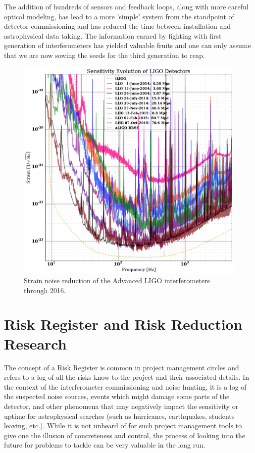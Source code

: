 The addition of hundreds of sensors and feedback loops, along with more careful
optical modeling, has lead to a more 'simple' system from the standpoint of
detector commissioning and has reduced the time between installation and astrophysical
data taking. The information earned by fighting with first generation of
interferometers has yielded valuable fruits and one can only assume that we are
now sowing the seeds for the third generation to reap.

\begin{figure}[h]
\centering
\includegraphics[width=\columnwidth]{Figures/aLIGO_noises.pdf}
\caption{Strain noise reduction of the Advanced LIGO interferometers
  through 2016.}
\label{fig:IDC:aLIGOnoises}
\end{figure}


\section{Risk Register and Risk Reduction Research}
\label{s:IDC:Risk}
The concept of a Risk Register is common in project management circles and refers
to a log of all the risks know to the project and their associated details. In
the context of the interferometer commissioning and noise hunting, it is a log of
the suspected noise sources, events which might damage some parts of the detector,
and other phenomena that may negatively impact the sensitivity or uptime for
astrophysical searches (such as hurricanes, earthquakes, students leaving, etc.).
While it is not unheard of for such project management tools to give one the
illusion of concreteness and control, the process of looking into the future
for problems to tackle can be very valuable in the long run.

